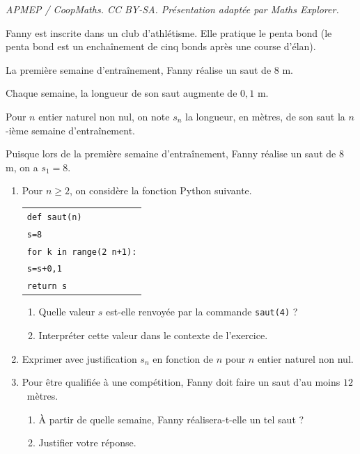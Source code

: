 \documentclass[10pt]{article}
\begin{document}
\noindent\textit{APMEP / CoopMaths. CC BY-SA. Présentation adaptée par Maths Explorer.}\par\medskip
\medskip

Fanny est inscrite dans un club d'athlétisme. Elle pratique le penta bond (le penta bond est un enchaînement de cinq bonds après une course d'élan).

La première semaine d'entraînement, Fanny réalise un saut de $8$ m.

Chaque semaine, la longueur de son saut augmente de $0,1$ m.

Pour $n$ entier naturel non nul, on note $s_n$ la longueur, en mètres, de son saut la $n$-ième semaine d'entraînement.

Puisque lors de la première semaine d'entraînement, Fanny réalise un saut de $8$ m, on a $s_1 = 8$.

\medskip

\begin{enumerate}
\item Pour $n \geqslant 2$, on considère la fonction Python suivante.

\begin{center}
\begin{tabularx}{0.4\linewidth}{|X|}\hline
\texttt{def saut(n)}\\
\quad  \texttt{s=8}\\
\quad  \texttt{for k in range(2~n+1):}\\
\qquad\quad \texttt{s=s+0,1}\\
\quad \texttt{return s}\\ \hline
\end{tabularx}
\end{center}

	\begin{enumerate}
		\item Quelle valeur $s$ est-elle renvoyée par la commande \texttt{saut(4)} ?
		\item Interpréter cette valeur dans le contexte de l'exercice.
	\end{enumerate}
\item Exprimer avec justification $s_n$ en fonction de $n$ pour $n$ entier naturel non nul.
\item Pour être qualifiée à une compétition, Fanny doit faire un saut d'au moins $12$~mètres.
	\begin{enumerate}
		\item À partir de quelle semaine, Fanny réalisera-t-elle un tel saut ? 
		\item Justifier votre réponse.
	\end{enumerate}
\end{enumerate}
\end{document}
